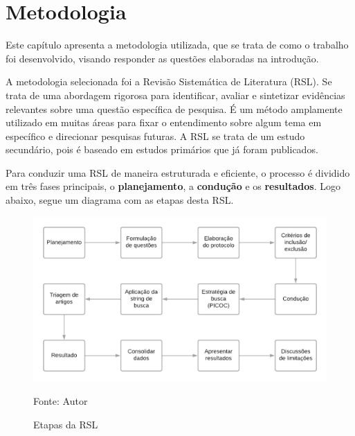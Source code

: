\chapter[Metodologia]{Metodologia}

Este capítulo apresenta a metodologia utilizada, que se trata de como o trabalho foi desenvolvido, visando responder as questões elaboradas na introdução.

A metodologia selecionada foi a Revisão Sistemática de Literatura (RSL). Se trata de uma abordagem rigorosa para identificar, avaliar e sintetizar evidências relevantes sobre uma questão específica de pesquisa.
É um método amplamente utilizado em muitas áreas para fixar o entendimento sobre algum tema em específico e direcionar pesquisas futuras. A RSL se trata de um estudo secundário, pois é baseado em estudos primários que já foram publicados.

Para conduzir uma RSL de maneira estruturada e eficiente, o processo é dividido em três fases principais, o \textbf{planejamento}, a \textbf{condução} e os \textbf{resultados}. Logo abaixo, segue um diagrama com as etapas desta RSL.

\begin{figure}[h]
	\centering %
	\includegraphics[width=16cm]{figuras/diagrama-RSL.png} %
	\caption{Etapas da RSL}
	Fonte: Autor
	\label{figura:diagrama rsl}
\end{figure}

